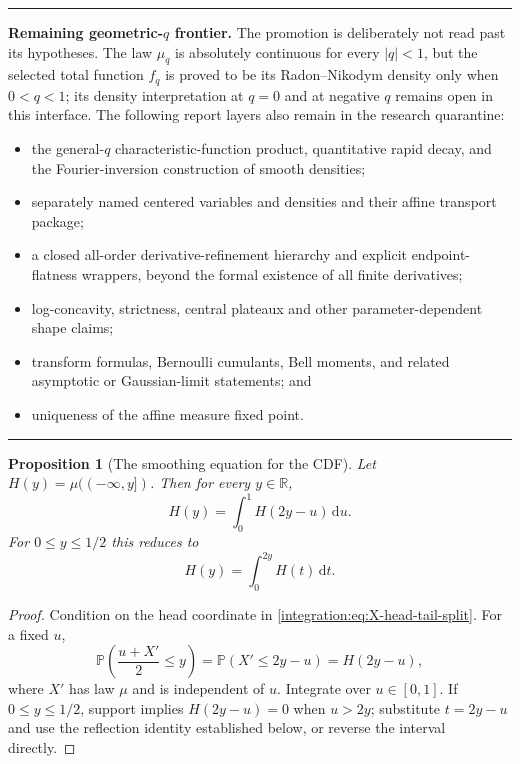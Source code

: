 \documentclass[11pt,oneside]{article}
\newtheorem{proposition}[proposition]{Proposition}
\theoremstyle{definition}
\theoremstyle{remark}
\newcommand{\R}{\mathbb R}
\newcommand{\dd}{\,\mathrm d}
\newcommand{\Prob}{\mathbb P}
\newenvironment{boxedremark}{%
  \par\smallskip\noindent\begin{center}\begin{minipage}{0.94\textwidth}%
  \color{black}\hrule\vspace{0.6em}\small
}{%
  \vspace{0.6em}\hrule\end{minipage}\end{center}\smallskip
}
\begin{document}
\begin{boxedremark}
\textbf{Remaining geometric-\(q\) frontier.}
The promotion is deliberately not read past its hypotheses.  The law \(\mu_q\) is absolutely
continuous for every \(|q|<1\), but the selected total function \(f_q\) is proved to be its
Radon--Nikodym density only when \(0<q<1\); its density interpretation at \(q=0\) and at
negative \(q\) remains open in this interface.  The following report layers also remain in
the research quarantine:
\begin{itemize}
\item the general-\(q\) characteristic-function product, quantitative rapid decay, and the
      Fourier-inversion construction of smooth densities;
\item separately named centered variables and densities and their affine transport package;
\item a closed all-order derivative-refinement hierarchy and explicit endpoint-flatness
      wrappers, beyond the formal existence of all finite derivatives;
\item log-concavity, strictness, central plateaux and other parameter-dependent shape claims;
\item transform formulas, Bernoulli cumulants, Bell moments, and related asymptotic or
      Gaussian-limit statements; and
\item uniqueness of the affine measure fixed point.
\end{itemize}
\end{boxedremark}

\begin{proposition}[The smoothing equation for the CDF]
\label{integration:prop:CDF-smoothing-detailed}
Let $H(y)=\mu(({-\infty},y])$.  Then for every $y\in\R$,
\begin{equation}
 H(y)=\int_0^1 H(2y-u)\dd u.
 \label{integration:eq:CDF-smoothing-detailed}
\end{equation}
For $0\le y\le1/2$ this reduces to
\begin{equation}
 H(y)=\int_0^{2y}H(t)\dd t.
 \label{integration:eq:CDF-left-detailed}
\end{equation}
\end{proposition}

\begin{proof}
Condition on the head coordinate in \eqref{integration:eq:X-head-tail-split}.  For a fixed $u$,
\[
 \Prob\!\left(\frac{u+X'}2\le y\right)=\Prob(X'\le2y-u)=H(2y-u),
\]
where $X'$ has law $\mu$ and is independent of $u$.  Integrate over $u\in[0,1]$.  If
$0\le y\le1/2$, support implies $H(2y-u)=0$ when $u>2y$; substitute $t=2y-u$ and use the
reflection identity established below, or reverse the interval directly.
\end{proof}
\end{document}
